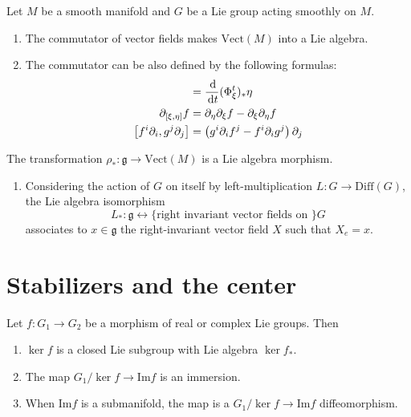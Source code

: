 \documentclass{report}
\begin{document}
\begin{proposition}
    Let $M$ be a smooth manifold and $G$ be a Lie group acting smoothly on $M$.
    \begin{enumerate}[label = (\roman*)]
        \item The commutator of vector fields makes $\mathrm{Vect}(M)$ into a Lie algebra.
        \item The commutator can be also defined by the following formulas:
        \begin{align*}
            [\xi, \eta] &= \frac{\d}{\d t} (\Phi^t_\xi)_* \eta \\
            \partial_{[\xi, \eta]}f &= \partial_\eta \partial_\xi f - \partial_\xi \partial_\eta f\\
            \left[ f^i \partial_i, g^j \partial_j \right] &= \left( g^i \partial_i f^j - f^i \partial_i g^j \right) \partial_j
        \end{align*}
    \end{enumerate}
\end{proposition}

\begin{theorem}
    The transformation $\rho_*: \mathfrak g \to \mathrm{Vect}(M)$ is a Lie algebra morphism.
\end{theorem}

\begin{example}
    \begin{enumerate}[label = (\roman*)]
        \item Considering the action of $G$ on itself by left-multiplication $L: G \to \mathrm{Diff}(G)$, the Lie algebra isomorphism
        \[
        L_*: \mathfrak g \leftrightarrow \{\text{right invariant vector fields on } \} G
        \]
        associates to $x \in \mathfrak g$ the right-invariant vector field $X$ such that $X_e = x$.
    \end{enumerate}
\end{example}

\section{Stabilizers and the center}
\begin{corollary}
    Let $f: G_1 \to G_2$ be a morphism of real or complex Lie groups.
    Then 
    \begin{enumerate}[label = (\roman*)]
        \item $\ker f $ is a closed Lie subgroup with Lie algebra $\ker f_*$.
        \item The map $G_1/\ker f \to \mathrm{Im} f$ is an immersion.
        \item When $\mathrm{Im}f$ is a submanifold, the map is a $G_1/\ker f \to \mathrm{Im}f$ diffeomorphism.
    \end{enumerate}
\end{corollary}
\end{document}
